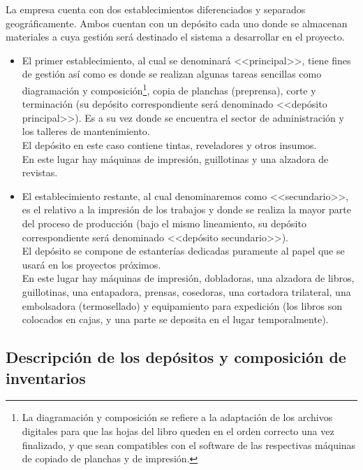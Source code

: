 \documentclass[a4paper, 12pt,twoside]{report}  %
\numberwithin{equation}{subsection} %
\begin{document}
La empresa cuenta con dos establecimientos diferenciados y separados geográficamente. Ambos cuentan con un depósito cada uno donde se almacenan materiales a cuya gestión será destinado el sistema a desarrollar en el proyecto.
\begin{itemize}
\item El primer establecimiento, al cual se denominará <<principal>>, tiene fines de gestión así como es donde se realizan algunas tareas sencillas como diagramación y composición\renewcommand*{\thefootnote}{\fnsymbol{footnote}}\footnote[1]{La diagramación y composición se refiere a la adaptación de los archivos digitales para que las hojas del libro queden en el orden correcto una vez finalizado, y que sean compatibles con el software de las respectivas máquinas de copiado de planchas y de impresión.}\renewcommand*{\thefootnote}{\arabic{footnote}}, copia de planchas (preprensa), corte y terminación (su depósito correspondiente será denominado <<depósito principal>>). Es a su vez donde se encuentra el sector de administración y los talleres de mantenimiento.\\
El depósito en este caso contiene tintas, reveladores y otros insumos.\\
En este lugar hay máquinas de impresión, guillotinas y una alzadora de revistas.
\item El establecimiento restante, al cual denominaremos como <<secundario>>, es el relativo a la impresión de los trabajos y donde se realiza la mayor parte del proceso de producción (bajo el mismo lineamiento, su depósito correspondiente será denominado <<depósito secundario>>).\\
El depósito se compone de estanterías dedicadas puramente al papel que se usará en los proyectos próximos.\\
En este lugar hay máquinas de impresión, dobladoras, una alzadora de libros, guillotinas, una entapadora, prensas, cosedoras, una cortadora trilateral, una embolsadora (termosellado) y equipamiento para expedición (los libros son colocados en cajas, y una parte se deposita en el lugar temporalmente).
\end{itemize}

 \subsection{Descripción de los depósitos y composición de inventarios}
\end{document}
